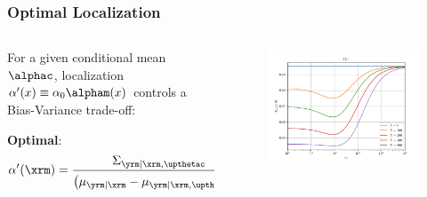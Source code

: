 \documentclass[aspectratio=169]{beamer}
\begin{document}
\begin{frame}
\frametitle{Optimal Localization}

\begin{columns}[c]

\begin{column}{.5\linewidth}

For a given conditional mean $\alphac$, localization $\alpha'(x) \equiv \alpha_0 \alpham(x)$ controls a \alert{Bias-Variance} trade-off:
\vspace{-1em}
\begin{table}
\renewcommand{\arraystretch}{1.8}
\end{table}

\vspace{.5em}
\textbf{Optimal}: 
\vspace{-.5em}
\begin{equation*} \label{eq:alpha_x_min_Rex}
	\alpha'(\xrm) = \frac{\Sigma_{\yrm | \xrm,\upthetac}}{\left( \mu_{\yrm | \xrm} - \mu_{\yrm | \xrm,\upthetac} \right)^2}
\end{equation*}

\end{column}

\begin{column}{.5\linewidth}

\begin{figure}
	\centering
	\includegraphics[width=1\linewidth]{Discrete/SE/risk_a0_leg_N.png}
	\label{fig:Discrete/SE/risk_a0_leg_N}
\end{figure} 


\end{column}
\end{columns}
\end{frame}
\end{document}
